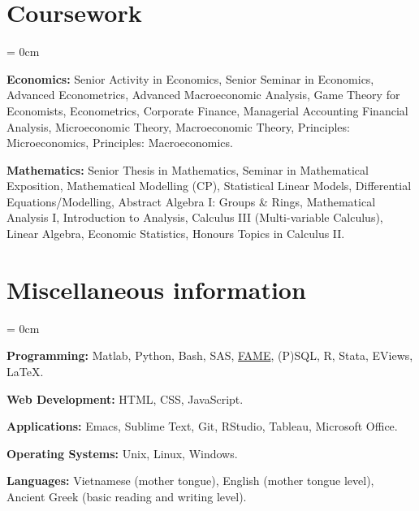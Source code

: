 \documentclass[a4paper, 11pt]{article}
\begin{document}
  \section{Coursework}
  \begin{compactitem}\parskip = 0cm
    \item \textbf{Economics:} Senior Activity in Economics, Senior Seminar in Economics, Advanced Econometrics, Advanced Macroeconomic Analysis, Game Theory for Economists, Econometrics, Corporate Finance,  Managerial Accounting Financial Analysis, Microeconomic Theory,  Macroeconomic Theory, Principles: Microeconomics, Principles: Macroeconomics.
    \item  \textbf{Mathematics:} Senior Thesis in Mathematics, Seminar in Mathematical Exposition, Mathematical Modelling (CP), Statistical Linear Models, Differential Equations/Modelling, Abstract Algebra I: Groups \& Rings, Mathematical Analysis I, Introduction to Analysis, Calculus III (Multi-variable Calculus), Linear Algebra, Economic Statistics, Honours Topics in Calculus II.
  \end{compactitem}
  \fi
    
  \section{Miscellaneous information}
  \begin{compactitem}\parskip = 0cm
    \item \textbf{Programming:} Matlab, Python, Bash, SAS, \href{https://en.wikipedia.org/wiki/FAME_(database)}{FAME}, (P)SQL, R, Stata, EViews, \LaTeX.
    \item \textbf{Web Development:} HTML, CSS, JavaScript.
    \item \textbf{Applications:} Emacs, Sublime Text, Git, RStudio, Tableau, Microsoft Office.
    \item \textbf{Operating Systems:} Unix, Linux, Windows.
    \item \textbf{Languages:} Vietnamese (mother tongue), English (mother tongue level), Ancient Greek (basic reading and writing level).
  \end{compactitem}
      
  \cleardoublepage
    
  \begin{publications}
  \end{publications}
\end{document}
